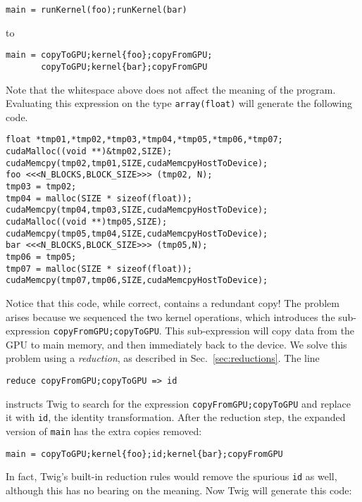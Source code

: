 \begin{verbatim}
main = runKernel(foo);runKernel(bar)
\end{verbatim}

to 

\begin{verbatim}
main = copyToGPU;kernel{foo};copyFromGPU;
       copyToGPU;kernel{bar};copyFromGPU
\end{verbatim}

Note that the whitespace above does not affect the meaning of the program. Evaluating this expression on the type \texttt{array(float)} will generate the following code.

\begin{verbatim}
float *tmp01,*tmp02,*tmp03,*tmp04,*tmp05,*tmp06,*tmp07;
cudaMalloc((void **)&tmp02,SIZE);
cudaMemcpy(tmp02,tmp01,SIZE,cudaMemcpyHostToDevice);
foo <<<N_BLOCKS,BLOCK_SIZE>>> (tmp02, N);
tmp03 = tmp02;
tmp04 = malloc(SIZE * sizeof(float));
cudaMemcpy(tmp04,tmp03,SIZE,cudaMemcpyHostToDevice);
cudaMalloc((void **)tmp05,SIZE);
cudaMemcpy(tmp05,tmp04,SIZE,cudaMemcpyHostToDevice);
bar <<<N_BLOCKS,BLOCK_SIZE>>> (tmp05,N);
tmp06 = tmp05;
tmp07 = malloc(SIZE * sizeof(float));
cudaMemcpy(tmp07,tmp06,SIZE,cudaMemcpyHostToDevice);
\end{verbatim}

Notice that this code, while correct, contains a redundant copy! The problem arises because we sequenced the two kernel operations, which introduces the sub-expression \texttt{copyFromGPU;copyToGPU}. This sub-expression will copy data from the GPU to main memory, and then immediately back to the device. We solve this problem using a \emph{reduction}, as described in Sec.~\ref{sec:reductions}. The line

\begin{verbatim}
reduce copyFromGPU;copyToGPU => id
\end{verbatim}

instructs Twig to search for the expression \texttt{copyFromGPU;copyToGPU} and replace it with \texttt{id}, the identity transformation. After the reduction step, the expanded version of \texttt{main} has the extra copies removed:

\begin{verbatim}
main = copyToGPU;kernel{foo};id;kernel{bar};copyFromGPU
\end{verbatim}

In fact, Twig's built-in reduction rules would remove the spurious \texttt{id} as well, although this has no bearing on the meaning. Now Twig will generate this code:

